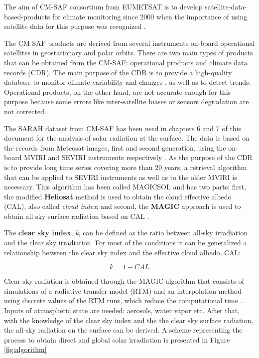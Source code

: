 The aim of CM-SAF consortium from EUMETSAT is to develop satellite-data-based-products for climate monitoring since 2000 when the importance of using satellite data for this purpose was recognized \cite*{schulz2009operational}.

The CM SAF products are derived from several instruments on-board operational satellites in geostationary and polar orbits. There are two main types of products that can be obtained from the CM-SAF: operational products and climate data records (CDR). The main purpose of the CDR is to provide a high-quality database to monitor climate variability and changes \cite*{Muller2015}, as well as to detect trends. Operational products, on the other hand, are not accurate enough for this purpose because some errors like inter-satellite biases or sensors degradation are not corrected.


The SARAH dataset from CM-SAF has been used in chapters 6 and 7 of this document for the analysis of solar radiation at the surface. The data is based on the records from Meteosat images, first and second generation, using the on-board MVIRI and SEVIRI instruments respectively \cite*{Posselt2012}. As the purpose of the CDR is to provide long time series covering more than 20 years, a retrieval algorithm that can be applied to SEVIRI instruments as well as to the older MVIRI is necessary. This algorithm has been called MAGICSOL and has two parts: first, the modified \textbf{Heliosat} method is used to obtain the cloud effective albedo (CAL), also called \textit{cloud index};  and second, the \textbf{MAGIC} approach is used to obtain all sky surface radiation based on CAL \cite*{Posselt2012}. %

The \textbf{clear sky index}, \textit{k}, can be defined as the ratio between all-sky irradiation and the clear sky irradiation. For most of the conditions it can be generalized a relationship between the clear sky index and the effective cloud albedo, CAL:

\begin{equation}
  k=1-CAL
\end{equation}

Clear sky radiation is obtained through the MAGIC algorithm \cite*{mueller2009} that consists of simulations of a radiative transfer model (RTM) and an interpolation method using discrete values of the RTM runs, which reduce the computational time \cite*{mueller2009}. Inputs of atmospheric state are needed: aerosols, water vapor etc. After that, with the knowledge of the clear sky index and the the clear sky surface radiation, the all-sky radiation on the surface can be derived. A scheme representing the process to obtain direct and global solar irradiation is presented in Figure \ref{fig:algorithm}\\

